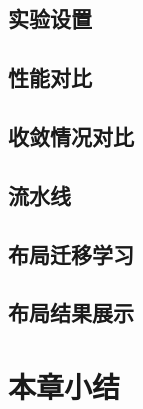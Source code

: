 \subsection{实验设置}


\subsection{性能对比}



\subsection{收敛情况对比}


\subsection{流水线}


\subsection{布局迁移学习}


\subsection{布局结果展示}


\section{本章小结}











































































